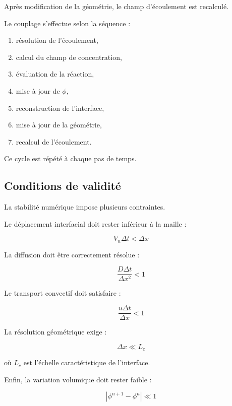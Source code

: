 \documentclass[12pt,a4paper]{report}
\begin{document}
Après modification de la géométrie, le champ d’écoulement est recalculé.

Le couplage s’effectue selon la séquence :

\begin{enumerate}
\item résolution de l’écoulement,
\item calcul du champ de concentration,
\item évaluation de la réaction,
\item mise à jour de $\phi$,
\item reconstruction de l’interface,
\item mise à jour de la géométrie,
\item recalcul de l’écoulement.
\end{enumerate}

Ce cycle est répété à chaque pas de temps.

\subsection{Conditions de validité}

La stabilité numérique impose plusieurs contraintes.

Le déplacement interfacial doit rester inférieur à la maille :

\begin{equation}
V_n\Delta t < \Delta x
\end{equation}

La diffusion doit être correctement résolue :

\begin{equation}
\frac{D\Delta t}{\Delta x^2}<1
\end{equation}

Le transport convectif doit satisfaire :

\begin{equation}
\frac{u\Delta t}{\Delta x}<1
\end{equation}

La résolution géométrique exige :

\begin{equation}
\Delta x \ll L_c
\end{equation}

où $L_c$ est l’échelle caractéristique de l’interface.

Enfin, la variation volumique doit rester faible :

\begin{equation}
|\phi^{n+1}-\phi^n| \ll 1
\end{equation}
\end{document}
